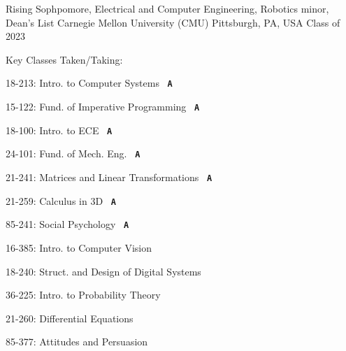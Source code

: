 
\newcommand{\grade}[1]{\ \textcolor{awesome-orange}{\textbf{\texttt{{#1}}}}}



\begin{cventries}


\cventry
{Rising Sophpomore, Electrical and Computer Engineering, Robotics minor, Dean's List} %
{Carnegie Mellon University (CMU)} %
{Pittsburgh, PA, USA} %
{Class of 2023} %
{ %
	Key Classes Taken/Taking:\smallskip
	\begin{cvitems}
	\begin{multicols}{2}[]
		\item 18-213: Intro. to Computer Systems \grade{A}
		\item 15-122: Fund. of Imperative Programming \grade{A}
		\item 18-100: Intro. to ECE \grade{A}
		\item 24-101: Fund. of Mech. Eng. \grade{A}
		\item 21-241: Matrices and Linear Transformations \grade{A}
		\item 21-259: Calculus in 3D \grade{A}
		\item 85-241: Social Psychology \grade{A}
		\item 16-385: Intro. to Computer Vision \grade{}
		\item 18-240: Struct. and Design of Digital Systems \grade{}
		\item 36-225: Intro. to Probability Theory \grade{}
		\item 21-260: Differential Equations \grade{}
		\item 85-377: Attitudes and Persuasion \grade{} 
	\end{multicols}
	\end{cvitems}
}


\end{cventries}
